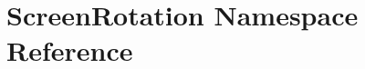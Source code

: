 \hypertarget{namespace_screen_rotation}{}\section{Screen\+Rotation Namespace Reference}
\label{namespace_screen_rotation}
